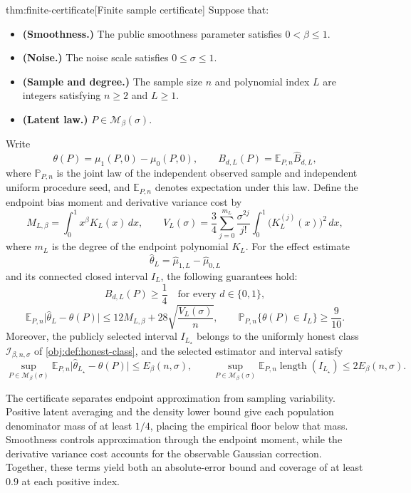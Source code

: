 \documentclass[11pt]{article}
\begin{document}
\begin{theoremv}{thm:finite-certificate}[Finite sample certificate]
Suppose that:
\begin{itemize}
\item \textbf{(Smoothness.)} The public smoothness parameter satisfies \(0<\beta\le1\).
\item \textbf{(Noise.)} The noise scale satisfies \(0\le\sigma\le1\).
\item \textbf{(Sample and degree.)} The sample size \(n\) and polynomial index \(L\) are integers satisfying \(n\ge2\) and \(L\ge1\).
\item \textbf{(Latent law.)} \(P\in\mathcal M_\beta(\sigma)\).
\end{itemize}
Write
\[
\theta(P)=\mu_1(P,0)-\mu_0(P,0),
\qquad
B_{d,L}(P)=\mathbb E_{P,n}\widehat B_{d,L},
\]
where \(\mathbb P_{P,n}\) is the joint law of the independent observed sample and independent uniform procedure seed, and \(\mathbb E_{P,n}\) denotes expectation under this law. Define the endpoint bias moment and derivative variance cost by
\[
M_{L,\beta}
=\int_0^1 x^\beta K_L(x)\,dx,
\qquad
V_L(\sigma)
=\frac34\sum_{j=0}^{m_L}
\frac{\sigma^{2j}}{j!}
\int_0^1\bigl(K_L^{(j)}(x)\bigr)^2\,dx,
\]
where \(m_L\) is the degree of the endpoint polynomial \(K_L\).
For the effect estimate
\[
\widehat\theta_L=\widehat\mu_{1,L}-\widehat\mu_{0,L}
\]
and its connected closed interval \(I_L\), the following guarantees hold:
\[
B_{d,L}(P)\ge\frac14
\quad\text{for every }d\in\{0,1\},
\]
\[
\mathbb E_{P,n}\bigl|\widehat\theta_L-\theta(P)\bigr|
\le
12M_{L,\beta}
+28\sqrt{\frac{V_L(\sigma)}{n}},
\qquad
\mathbb P_{P,n}\{\theta(P)\in I_L\}\ge\frac9{10}.
\]
Moreover, the publicly selected interval \(I_{L_\star}\) belongs to the uniformly honest class \(\mathcal I_{\beta,n,\sigma}\) of \cref{obj:def:honest-class}, and the selected estimator and interval satisfy
\[
\sup_{P\in\mathcal M_\beta(\sigma)}
\mathbb E_{P,n}
\bigl|\widehat\theta_{L_\star}-\theta(P)\bigr|
\le E_\beta(n,\sigma),
\qquad
\sup_{P\in\mathcal M_\beta(\sigma)}
\mathbb E_{P,n}\operatorname{length}(I_{L_\star})
\le2E_\beta(n,\sigma).
\]
\end{theoremv}

The certificate separates endpoint approximation from sampling variability. Positive latent averaging and the density lower bound give each population denominator mass of at least \(1/4\), placing the empirical floor below that mass. Smoothness controls approximation through the endpoint moment, while the derivative variance cost accounts for the observable Gaussian correction. Together, these terms yield both an absolute-error bound and coverage of at least \(0.9\) at each positive index.
\end{document}
